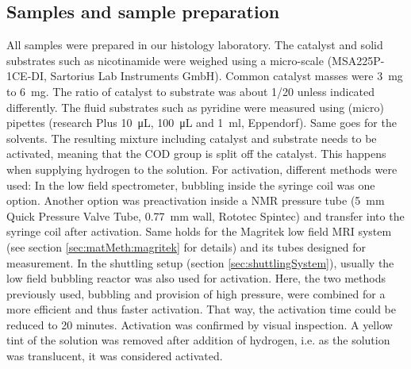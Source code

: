        \subsection{Samples and sample preparation}
        All samples were prepared in our histology laboratory. The catalyst and solid substrates such as nicotinamide were weighed  using a micro-scale (MSA225P-1CE-DI, Sartorius Lab Instruments GmbH). Common catalyst masses were \SI{3}{\milli\gram} to \SI{6}{\milli\gram}. The ratio of catalyst to substrate was about \SI{1/20}{} unless indicated differently. The fluid substrates such as pyridine were measured using  (micro) pipettes (research Plus \SI{10}{\micro\liter}, \SI{100}{\micro\liter} and \SI{1}{\ml}, Eppendorf). Same goes for the solvents.
        The resulting mixture including catalyst and substrate needs to be activated, meaning that the COD group is split off the catalyst. This happens when supplying hydrogen to the solution. For activation, different methods were used: In the low field spectrometer, bubbling inside the syringe coil was one option. Another option was preactivation inside a NMR pressure tube (\SI{5}{\mm} Quick Pressure Valve Tube, \SI{0.77}{\mm} wall, Rototec Spintec) and transfer into the syringe coil after activation. Same holds for the Magritek low field MRI system (see section \ref{sec:matMeth:magritek} for details) and its tubes designed for measurement.
        In the shuttling setup (section \ref{sec:shuttlingSystem}), usually the low field bubbling reactor was also used for activation. Here, the two methods previously used, bubbling and provision of high pressure, were combined for a more efficient and thus faster activation. That way, the activation time could be reduced to 20 minutes.
        Activation was confirmed by visual inspection. A yellow tint of the solution was removed after addition of hydrogen, i.e. as the solution was translucent, it was considered activated.
